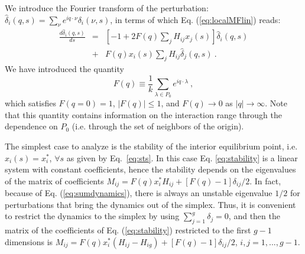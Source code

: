 We introduce the Fourier transform of the perturbation:
$\hat\delta_i(q,s) = \sum_\nu e^{i q\cdot\nu}
\delta_i(\nu,s)$, in terms of which Eq.
(\ref{eq:localMFlin}) reads:
\begin{eqnarray}
  \frac{d\hat\delta_i(q,s)}{ds} &=& \left[ -1 + 2 F(q) \sum_j H_{ij} x_j(s) \right]\hat\delta_i(q,s) \nonumber \\
                                &+& F(q) x_i(s) \sum_j H_{ij} \hat\delta_j(q,s) \ .
\label{eq:stability}
\end{eqnarray}
We have introduced the quantity
\begin{equation}
  \label{eq:fourarA}
  F(q)\equiv \frac{1}{k}\sum_{\lambda \in P_{0}} e^{iq \cdot \lambda} \ ,
\end{equation}
which satisfies $F(q = 0)=1$, $|F(q)|\le 1$, and
$F(q)\to 0$ as $|q|\to \infty$. Note that this quantity
contains information on the interaction range through the
dependence on $P_{{0}}$ (i.e. through the set of neighbors of the origin). 

The simplest case to analyze is the stability of the interior
equilibrium point, i.e. $x_i(s)=x_i^*$, $\forall s$ as given by
Eq.~\eqref{eq:sts}. In this case Eq. \eqref{eq:stability} is a
linear system with constant coefficients, hence the stability
depends on the eigenvalues of the matrix of coefficients
$M_{ij}=F(q)x_i^* H_{ij} + [F(q)-1]\delta_{ij}/2$.  In
fact, because of Eq. (\ref{eq:sumdynamics}), there is always an
unstable eigenvalue $1/2$ for perturbations that bring the
dynamics out of the simplex. Thus, it is convenient to restrict
the dynamics to the simplex by using $\sum_{j=1}^g \delta_j=0$,
and then the matrix of the coefficients of Eq.
(\ref{eq:stability}) restricted to the first $g-1$ dimensions
is $M_{ij}=F(q)x_i^* (H_{ij}-H_{ig}) +
[F(q)-1]\delta_{ij}/2$, $i,j=1,...,g-1$.

